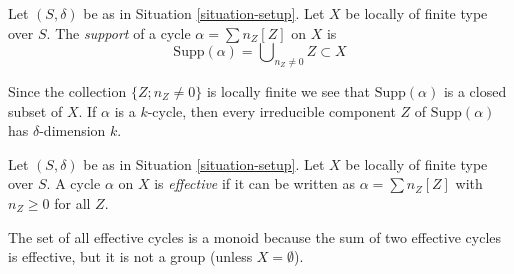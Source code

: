 \begin{definition}
\label{definition-support-cycle}
Let $(S, \delta)$ be as in Situation \ref{situation-setup}.
Let $X$ be locally of finite type over $S$.
The {\it support} of a cycle $\alpha = \sum n_Z [Z]$ on $X$
is
$$
\text{Supp}(\alpha) = \bigcup\nolimits_{n_Z \not = 0} Z \subset X
$$
\end{definition}

\noindent
Since the collection $\{Z; n_Z \not = 0\}$ is locally finite
we see that $\text{Supp}(\alpha)$ is a closed subset of $X$.
If $\alpha$ is a $k$-cycle, then every irreducible component $Z$
of $\text{Supp}(\alpha)$ has $\delta$-dimension $k$.

\begin{definition}
\label{definition-effective-cycle}
Let $(S, \delta)$ be as in Situation \ref{situation-setup}.
Let $X$ be locally of finite type over $S$.
A cycle $\alpha$ on $X$ is {\it effective} if it
can be written as $\alpha =\sum n_Z [Z]$ with $n_Z \geq 0$ for all $Z$.
\end{definition}

\noindent
The set of all effective cycles is a monoid because the sum of
two effective cycles is effective, but it is not a group
(unless $X = \emptyset$).




